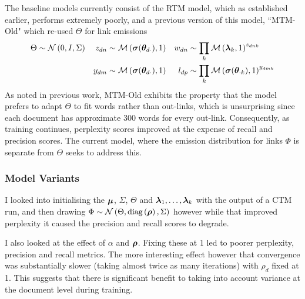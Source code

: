 The baseline models currently consist of the RTM model, which as established earlier, performs extremely poorly, and a previous version of this model, ``MTM-Old" which re-used $\Theta$ for link emissions
\begin{align}
\Theta & \sim \mathcal{N} \left(0, I, \Sigma\right) &
z_{dn} & \sim \mathcal{M} \left( {\bm \sigma({ \bm \theta_{d\cdot} })},{1} \right) &
w_{dn} & \sim \prod_k \mathcal{M} \left( {\bm \lambda_k},{1} \right)^{z_{dnk}} \\
& &
y_{dm} & \sim \mathcal{M} \left( {\bm \sigma({ \bm \theta_{d\cdot} })},{1} \right) &
l_{dp} & \sim \prod_k \mathcal{M} \left( {\bm \sigma({ \bm \theta_{\cdot k} })},{1} \right)^{y_{dmk}}
\end{align}
As noted in previous work, MTM-Old exhibits the property that the model prefers to adapt $\Theta$ to fit words rather than out-links, which is unsurprising since each document has approximate 300 words for every out-link. Consequently, as training continues, perplexity scores improved at the expense of recall and precision scores. The current model, where the emission distribution for links $\Phi$ is separate from $\Theta$ seeks to address this.

\subsubsection*{Model Variants}
I looked into initialising the $\bm \mu$, $\Sigma$, $\Theta$ and $\bm \lambda_1, \ldots, \bm \lambda_k$ with the output of a CTM run, and then drawing $\Phi \sim \mathcal{N} \left(\Theta, \text{diag} \left( {\bm \rho} \right), \Sigma\right)$ however while that improved perplexity it caused the precision and recall scores to degrade.

I also looked at the effect of $\alpha$ and $\bm \rho$. Fixing these at 1 led to poorer perplexity, precision and recall metrics. The more interesting effect however that convergence was substantially slower (taking almost twice as many iterations) with $\rho_d$ fixed at 1. This suggests that there is significant benefit to taking into account variance at the document level during training.




